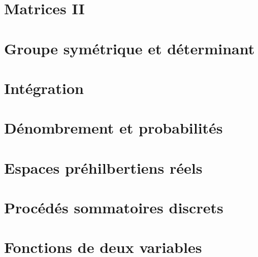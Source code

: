 \documentclass[10pt,a4paper]{report}
\theoremstyle{plain}
\theoremstyle{definition}
\theoremstyle{remark}
\begin{document}
\chapter{Matrices II}

    
        
\chapter{Groupe symétrique et déterminant}

    

\chapter{Intégration}

    
    
\chapter{Dénombrement et probabilités}

    
        
\chapter{Espaces préhilbertiens réels}

    

\chapter{Procédés sommatoires discrets}

    
        
\chapter{Fonctions de deux variables}

    






\end{document}
